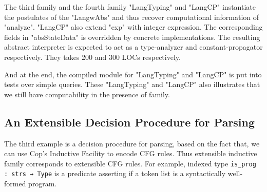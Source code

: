 The third family and the fourth family "LangTyping" and "LangCP" instantiate the postulates of the
"LangwAbs" and thus recover computational information of "analyze". "LangCP" also extend "exp" with integer expression. The corresponding fields in "absStateData" is overridden by concrete implementations. The resulting abstract interpreter is expected to act as a type-analyzer and constant-propagator respectively. They takes 200 and 300 LOCs respectively. 


And at the end, the compiled module for "LangTyping" and "LangCP" is put into tests over simple queries. These "LangTyping" and "LangCP" also illustrates that we still have
computability in the presence of family.

\subsection{An Extensible Decision Procedure for Parsing}
\label{sec:coqexample-parser}
The third example is a decision procedure for parsing, based on the fact that, we can use Cop's Inductive Facility to encode CFG rules. Thus extensible inductive family corresponds to extensible CFG rules. For example, indexed type \texttt{is_prog : strs → Type} is a predicate asserting if a token list is a syntactically well-formed program.

